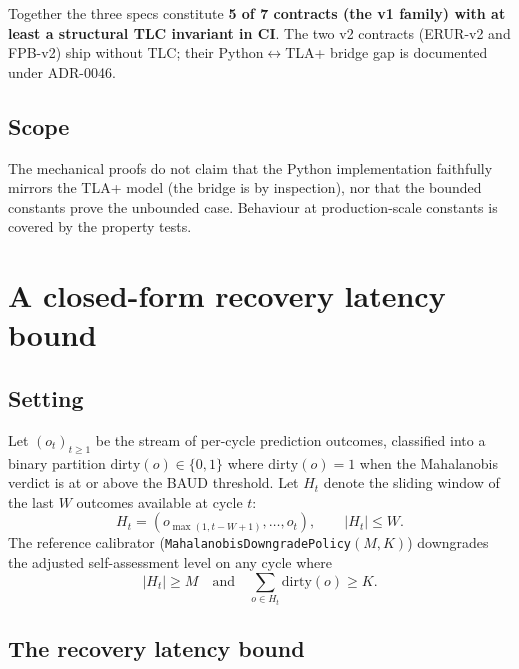 \documentclass[acmsmall,nonacm=true,review=false]{acmart}
\theoremstyle{plain}
\begin{document}
Together the three specs constitute \textbf{5 of 7 contracts
(the v1 family) with at least a structural TLC invariant in CI}.
The two v2 contracts (ERUR-v2 and FPB-v2) ship without TLC; their
Python$\leftrightarrow$TLA+ bridge gap is documented under
ADR-0046.

\subsection{Scope}
The mechanical proofs do not claim that the Python implementation
faithfully mirrors the TLA+ model (the bridge is by inspection),
nor that the bounded constants prove the unbounded case. Behaviour
at production-scale constants is covered by the property tests.

\section{A closed-form recovery latency bound}
\label{sec:theorem}

\subsection{Setting}
Let $(o_t)_{t\ge 1}$ be the stream of per-cycle prediction
outcomes, classified into a binary partition
$\mathrm{dirty}(o) \in \{0,1\}$ where $\mathrm{dirty}(o) = 1$ when
the Mahalanobis verdict is at or above the BAUD threshold. Let
$H_t$ denote the sliding window of the last $W$ outcomes available
at cycle $t$:
\begin{equation}
H_t = (o_{\max(1, t-W+1)}, \ldots, o_t), \qquad |H_t| \le W.
\end{equation}
The reference calibrator (\texttt{MahalanobisDowngradePolicy}$(M,K)$)
downgrades the adjusted self-assessment level on any cycle where
\begin{equation}\label{eq:cond1}
|H_t| \ge M \quad \text{and} \quad \sum_{o \in H_t} \mathrm{dirty}(o) \ge K.
\end{equation}

\subsection{The recovery latency bound}
\label{sec:rlb-bound}
\end{document}
